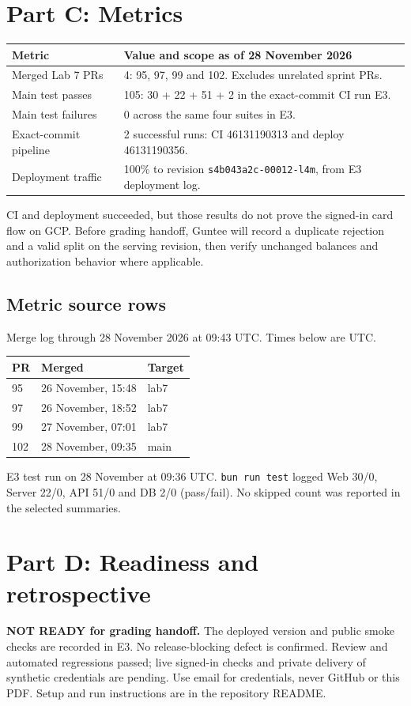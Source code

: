 \documentclass[11pt,a4paper]{article}
\begin{document}
\section{Part C: Metrics}
\begin{tabularx}{\linewidth}{lX}
Metric & Value and scope as of 28 November 2026\\\hline
Merged Lab 7 PRs & 4: 95, 97, 99 and 102. Excludes unrelated sprint PRs.\\
Main test passes & 105: 30 + 22 + 51 + 2 in the exact-commit CI run E3.\\
Main test failures & 0 across the same four suites in E3.\\
Exact-commit pipeline & 2 successful runs: CI 46131190313 and deploy 46131190356.\\
Deployment traffic & 100\% to revision \texttt{s4b043a2c-00012-l4m}, from E3 deployment log.\\
\end{tabularx}

CI and deployment succeeded, but those results do not prove the signed-in card flow on GCP. Before grading handoff, Guntee will record a duplicate rejection and a valid split on the serving revision, then verify unchanged balances and authorization behavior where applicable.
\subsection{Metric source rows}
Merge log through 28 November 2026 at 09:43 UTC. Times below are UTC.
\begin{tabularx}{\linewidth}{lXl}
PR & Merged & Target \\\hline
95 & 26 November, 15:48 & lab7 \\
97 & 26 November, 18:52 & lab7 \\
99 & 27 November, 07:01 & lab7 \\
102 & 28 November, 09:35 & main \\
\end{tabularx}

E3 test run on 28 November at 09:36 UTC. \texttt{bun run test} logged Web 30/0, Server 22/0, API 51/0 and DB 2/0 (pass/fail). No skipped count was reported in the selected summaries.
\section{Part D: Readiness and retrospective}
\textbf{NOT READY for grading handoff.} The deployed version and public smoke checks are recorded in E3. No release-blocking defect is confirmed. Review and automated regressions passed; live signed-in checks and private delivery of synthetic credentials are pending. Use email for credentials, never GitHub or this PDF. Setup and run instructions are in the repository README.
\end{document}
